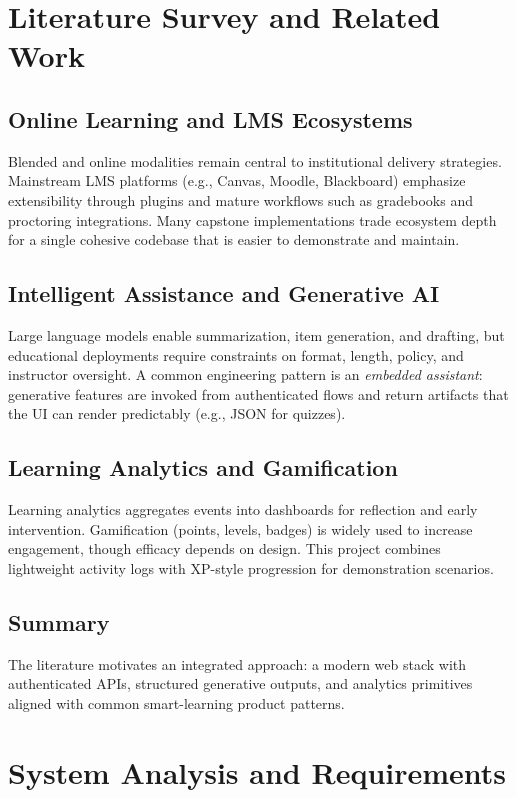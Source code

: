 \documentclass[a4paper,12pt,openany]{report}
\begin{document}
\chapter{Literature Survey and Related Work}

\section{Online Learning and LMS Ecosystems}
Blended and online modalities remain central to institutional delivery strategies. Mainstream LMS platforms (e.g., Canvas, Moodle, Blackboard) emphasize extensibility through plugins and mature workflows such as gradebooks and proctoring integrations. Many capstone implementations trade ecosystem depth for a single cohesive codebase that is easier to demonstrate and maintain.

\section{Intelligent Assistance and Generative AI}
Large language models enable summarization, item generation, and drafting, but educational deployments require constraints on format, length, policy, and instructor oversight. A common engineering pattern is an \textit{embedded assistant}: generative features are invoked from authenticated flows and return artifacts that the UI can render predictably (e.g., JSON for quizzes).

\section{Learning Analytics and Gamification}
Learning analytics aggregates events into dashboards for reflection and early intervention. Gamification (points, levels, badges) is widely used to increase engagement, though efficacy depends on design. This project combines lightweight activity logs with XP-style progression for demonstration scenarios.

\section{Summary}
The literature motivates an integrated approach: a modern web stack with authenticated APIs, structured generative outputs, and analytics primitives aligned with common smart-learning product patterns.

\chapter{System Analysis and Requirements}
\end{document}
